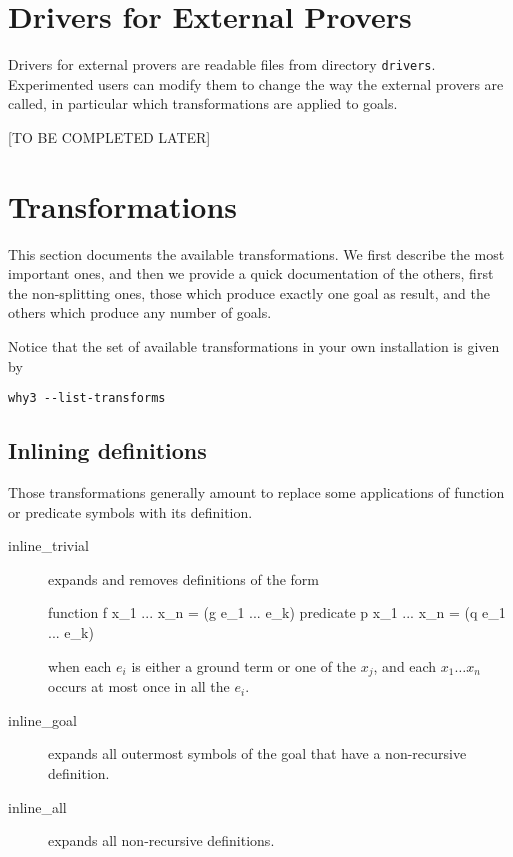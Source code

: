 \section{Drivers for External Provers}
\label{sec:drivers}

Drivers for external provers are readable files from directory
\texttt{drivers}. Experimented users can modify them to change the way
the external provers are called, in particular which transformations
are applied to goals.

[TO BE COMPLETED LATER]

\section{Transformations}
\label{sec:transformations}

This section documents the available transformations. We first
describe the most important ones, and then we provide a quick
documentation of the others, first the non-splitting ones, \eg those
which produce exactly one goal as result, and the others which produce any
number of goals.

Notice that the set of available transformations in your own
installation is given by
\begin{verbatim}
why3 --list-transforms
\end{verbatim}

\subsection{Inlining definitions}

Those transformations generally amount to replace some applications of
function or predicate symbols with its definition.

\begin{description}

\item[inline\_trivial]
  expands and removes definitions of the form
\begin{whycode}
function  f x_1 ... x_n = (g e_1 ... e_k)
predicate p x_1 ... x_n = (q e_1 ... e_k)
\end{whycode}
when each $e_i$ is either a ground term or one of the $x_j$, and
each $x_1 \dots x_n$ occurs at most once in all the $e_i$.

\item[inline\_goal] expands all outermost symbols of the goal that
  have a non-recursive definition.

\item[inline\_all]
  expands all non-recursive definitions.

\end{description}


